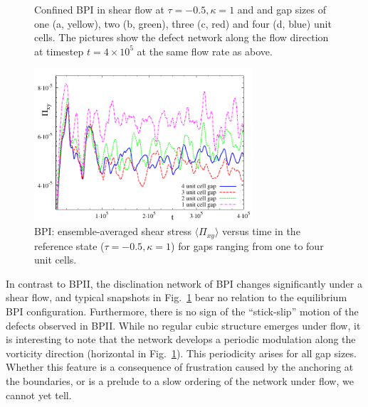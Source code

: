 \documentclass[12pt,twoside]{iopart}
\newcommand{\ex}[1]{\times10^{#1}}
\begin{document}
\begin{figure}[h]
\caption{Confined BPI in shear flow at $\tau=-0.5, \kappa=1$ and and gap sizes of one (a, yellow), two (b, green), three (c, red) and four (d, blue) unit cells. The pictures show the defect network along the flow direction at timestep $t=4\ex{5}$ at the same flow rate as above.}
\label{fig4}
\end{figure}


\begin{figure}[h]
\centering
\includegraphics[width=0.725\textwidth]{stress_bp1_fbc.pdf}
\caption{BPI: ensemble-averaged shear stress $\langle \Pi_{xy}\rangle$
versus time in the reference state ($\tau=-0.5, \kappa=1$) for gaps
ranging from one to four unit cells.}
\label{fig5}
\end{figure}

In contrast to BPII, the disclination network of BPI changes significantly
under a shear flow, and typical snapshots in Fig.~\ref{fig4} bear no
relation to the equilibrium BPI configuration. Furthermore, there is no sign of the ``stick-slip'' motion of the defects observed in BPII. While no regular cubic structure emerges under flow, it is interesting to note that the network develops a periodic modulation along the vorticity direction (horizontal in Fig.~\ref{fig4}). This periodicity arises for all gap sizes. Whether this feature is a consequence of frustration caused by the anchoring at the boundaries, or is a prelude to a slow ordering of the network under flow, we cannot yet tell.
\end{document}
